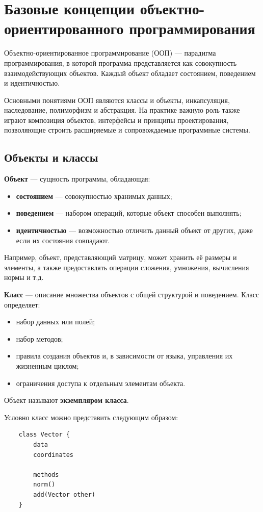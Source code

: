 \section{Базовые концепции объектно-ориентированного программирования}

Объектно-ориентированное программирование (ООП) --- парадигма программирования, в которой программа представляется как совокупность взаимодействующих объектов. Каждый объект обладает состоянием, поведением и идентичностью.

Основными понятиями ООП являются классы и объекты, инкапсуляция, наследование, полиморфизм и абстракция. На практике важную роль также играют композиция объектов, интерфейсы и принципы проектирования, позволяющие строить расширяемые и сопровождаемые программные системы.

\subsection{Объекты и классы}

\textbf{Объект} --- сущность программы, обладающая:
\begin{itemize}
	\item \textbf{состоянием} --- совокупностью хранимых данных;
	\item \textbf{поведением} --- набором операций, которые объект способен выполнять;
	\item \textbf{идентичностью} --- возможностью отличить данный объект от других, даже если их состояния совпадают.
\end{itemize}

Например, объект, представляющий матрицу, может хранить её размеры и элементы, а также предоставлять операции сложения, умножения, вычисления нормы и т.д.

\textbf{Класс} --- описание множества объектов с общей структурой и поведением. Класс определяет:
\begin{itemize}
	\item набор данных или полей;
	\item набор методов;
	\item правила создания объектов и, в зависимости от языка, управления их жизненным циклом;
	\item ограничения доступа к отдельным элементам объекта.
\end{itemize}

Объект называют \textbf{экземпляром класса}.

Условно класс можно представить следующим образом:
\begin{verbatim}
	class Vector {
		data
		coordinates
		
		methods
		norm()
		add(Vector other)
	}
\end{verbatim}

